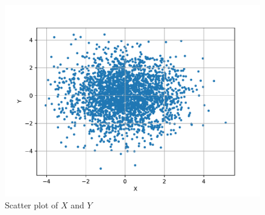 \documentclass[journal,10pt,twocolumn]{IEEEtran}
\begin{document}
\begin{enumerate}
\begin{enumerate}[label=(\alph{enumii})]
\begin{figure}[H]
\centering
\includegraphics[width=\columnwidth]{./figs/chapter6/zero_corr_verify.pdf}
\caption{Scatter plot of $X$ and $Y$}
\label{fig:zero_corr_scatter}
\end{figure}


\end{enumerate}
\end{enumerate}
\end{document}
